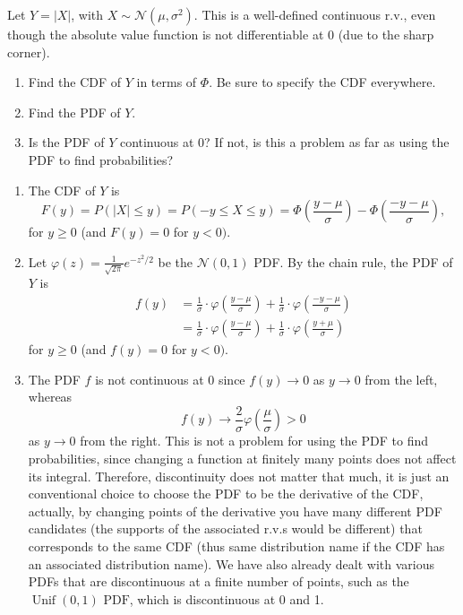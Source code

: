 

\setcounter{theorem}{28}
\begin{exercise}[BH.5.29] Let $Y=|X|$, with $X \sim \mathcal{N}\left(\mu, \sigma^2\right)$. This is a well-defined continuous r.v., even though the absolute value function is not differentiable at 0 (due to the sharp corner).
	\begin{enumerate}
		\item Find the CDF of $Y$ in terms of $\Phi$. Be sure to specify the CDF everywhere.
		\item Find the PDF of $Y$.
		\item Is the PDF of $Y$ continuous at 0? If not, is this a problem as far as using the PDF to find probabilities?
	\end{enumerate}  
\begin{solution}
    \begin{enumerate}
        \item The CDF of $Y$ is
        $$
        F(y)=P(|X| \leq y)=P(-y \leq X \leq y)=\Phi\left(\frac{y-\mu}{\sigma}\right)-\Phi\left(\frac{-y-\mu}{\sigma}\right),
        $$
        for $y \geq 0$ (and $F(y)=0$ for $y<0)$.
        \item Let $\varphi(z)=\frac{1}{\sqrt{2 \pi}} e^{-z^2 / 2}$ be the $\mathcal{N}(0,1)$ PDF. By the chain rule, the PDF of $Y$ is
        $$
        \begin{aligned}
            f(y) &=\frac{1}{\sigma} \cdot \varphi\left(\frac{y-\mu}{\sigma}\right)+\frac{1}{\sigma} \cdot \varphi\left(\frac{-y-\mu}{\sigma}\right) \\
            &=\frac{1}{\sigma} \cdot \varphi\left(\frac{y-\mu}{\sigma}\right)+\frac{1}{\sigma} \cdot \varphi\left(\frac{y+\mu}{\sigma}\right)
        \end{aligned}
        $$
        for $y \geq 0$ (and $f(y)=0$ for $y<0)$.
        \item  The PDF $f$ is not continuous at 0 since $f(y) \rightarrow 0$ as $y \rightarrow 0$ from the left, whereas
        $$
        f(y) \rightarrow \frac{2}{\sigma} \varphi\left(\frac{\mu}{\sigma}\right)>0
        $$
        as $y \rightarrow 0$ from the right. This is not a problem for using the PDF to find probabilities, since changing a function at finitely many points does not affect its integral. Therefore, discontinuity does not matter that much, it is just an conventional choice to choose the PDF to be the derivative of the CDF, actually, by changing points of the derivative you have many different PDF candidates (the supports of the associated r.v.s would be different) that corresponds to the same CDF (thus same distribution name if the CDF has an associated distribution name). We have also already dealt with various PDFs that are discontinuous at a finite number of points, such as the $\operatorname{Unif}(0,1)$ $\mathrm{PDF}$, which is discontinuous at 0 and 1.
    \end{enumerate}
\end{solution}
\end{exercise}


